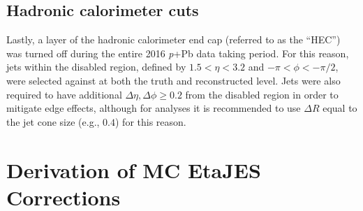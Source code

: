 \documentclass[NOTE, atlasdraft=true, texlive=2016, USenglish]{\ATLASLATEXPATH atlasdoc}
\begin{document}
\subsection{Hadronic calorimeter cuts}
Lastly, a layer of the hadronic calorimeter end cap (referred to as the ``HEC'') was turned off during the entire 2016 \textit{p}+Pb data taking period. For this reason, jets within the disabled region, defined by $1.5<\eta<3.2$ and $-\pi<\phi<-\pi/2$, were selected against at both the truth and reconstructed level. Jets were also required to have additional $\Delta\eta, \Delta\phi \geq 0.2$ from the disabled region in order to mitigate edge effects, although for analyses it is recommended to use $\Delta R$ equal to the jet cone size (e.g., $0.4$) for this reason.

%


\section{Derivation of MC EtaJES Corrections}
\label{sec:EtaJES}
\end{document}

